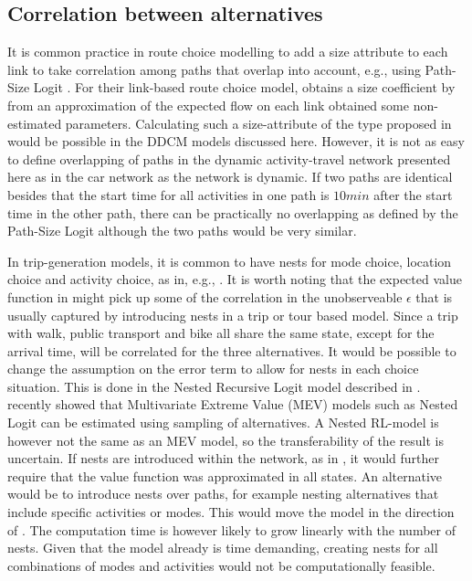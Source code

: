 \subsection{Correlation between alternatives}
It is common practice in route choice modelling to add a size attribute to each link to take correlation among paths that overlap into account, e.g., using Path-Size Logit \citep{BenAkivaBier99}. For their link-based route choice model, \citet{fosgerau2013} obtains a size coefficient by from an approximation of the expected flow on each link obtained some non-estimated parameters. Calculating such a size-attribute of the type proposed in \citet{fosgerau2013} would be possible in the DDCM models discussed here. However, it is not as easy to define overlapping of paths in the dynamic activity-travel network presented here as in the car network as the network is dynamic. If two paths are identical besides that the start time for all activities in one path is $10\unit{min}$ after the start time in the other path, there can be practically no overlapping as defined by the Path-Size Logit although the two paths would be very similar. 

In trip-generation models, it is common to have nests for mode choice, location choice and activity choice, as in, e.g., \citet{bowman2001}. It is worth noting that the expected value function in  might pick up some of the correlation in the unobserveable $\epsilon$ that is usually captured by introducing nests in a trip or tour based model. Since a trip with walk, public transport and bike all share the same state, except for the arrival time, \eutil will be correlated for the three alternatives. It would be possible to change the assumption on the error term to allow for nests in each choice situation. This is done in the Nested Recursive Logit model described in \citet{mai2015}.
\citet{guevara2013MEV} recently showed that Multivariate Extreme Value (MEV) models such as Nested Logit can be estimated using sampling of alternatives. A Nested RL-model is however not the same as an MEV model, so the transferability of the result is uncertain. If nests are introduced within the network, as in \citet{mai2015}, it would further require that the value function was approximated in all states. An alternative would be to introduce nests over paths, for example nesting alternatives that include specific activities or modes. This would move the model in the direction of \citet{bowman2001}. The computation time is however likely to grow linearly with the number of nests. Given that the model already is time demanding, creating nests for all combinations of modes and activities would not be computationally feasible.

